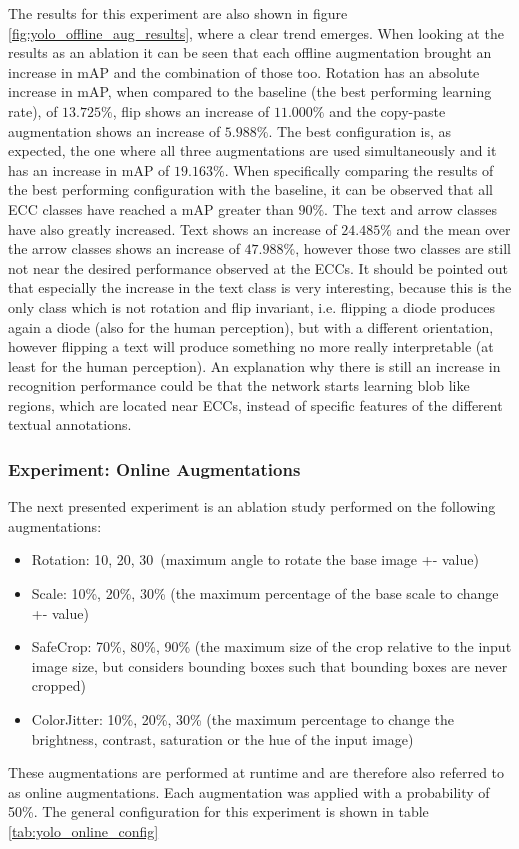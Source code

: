 The results for this experiment are also shown in figure \ref{fig:yolo_offline_aug_results}, where a clear trend emerges.
When looking at the results as an ablation it can be seen that each offline augmentation brought an increase in \ac{mAP} and the combination of those too.
Rotation has an absolute increase in mAP, when compared to the baseline (the best performing learning rate), of $13.725\%$, flip shows an increase of $11.000\%$ and the copy-paste augmentation shows an increase of $5.988\%$.
The best configuration is, as expected, the one where all three augmentations are used simultaneously and it has an increase in \ac{mAP} of $19.163\%$.
When specifically comparing the results of the best performing configuration with the baseline, it can be observed that all \ac{ECC} classes have reached a \ac{mAP} greater than $90\%$.
The text and arrow classes have also greatly increased.
Text shows an increase of $24.485\%$ and the mean over the arrow classes shows an increase of $47.988\%$, however those two classes are still not near the desired performance observed at the \acp{ECC}.
It should be pointed out that especially the increase in the text class is very interesting, because this is the only class which is not rotation and flip invariant, i.e. flipping a diode produces again a diode (also for the human perception), but with a different orientation, however flipping a text will produce something no more really interpretable (at least for the human perception).
An explanation why there is still an increase in recognition performance could be that the network starts learning blob like regions, which are located near \acp{ECC}, instead of specific features of the different textual annotations.


\subsubsection{Experiment: Online Augmentations}

The next presented experiment is an ablation study performed on the following augmentations:
\begin{itemize}
    \item Rotation: 10\textdegree, 20\textdegree, 30\textdegree\ (maximum angle to rotate the base image +- value)
    \item Scale: 10\%, 20\%, 30\% (the maximum percentage of the base scale to change +- value)
    \item SafeCrop: 70\%, 80\%, 90\% (the maximum size of the crop relative to the input image size, but considers bounding boxes such that bounding boxes are never cropped)
    \item ColorJitter: 10\%, 20\%, 30\% (the maximum percentage to change the brightness, contrast, saturation or the hue of the input image)
\end{itemize}
These augmentations are performed at runtime and are therefore also referred to as  online augmentations.
Each augmentation was applied with a probability of 50\%.
The general configuration for this experiment is shown in table \ref{tab:yolo_online_config}

